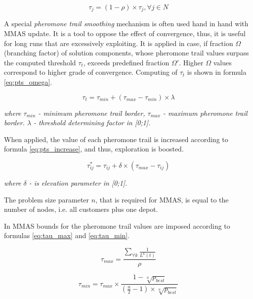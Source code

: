 \documentclass[12pt,a4paper,oneside]{book}
\begin{document}
\begin{enumerate}
\begin{equation}
\tau_j = (1-\rho) \times \tau_j, \forall j \in N
\label{eq:mmas_evaporation}
\end{equation}

A special \textit{pheromone trail smoothing} mechanism is often used hand in hand with MMAS update. It is a tool to oppose the effect of convergence, thus, it is useful for long runs that are excessively exploiting. It is applied in case, if fraction $\Omega$ (branching factor) of solution components, whose pheromone trail values surpass the computed threshold $\tau_t$, exceeds predefined fraction $\Omega'$. Higher $\Omega$ values correspond to higher grade of convergence. Computing of $\tau_t$ is shown in formula \eqref{eq:pts_omega}.

\begin{equation}
\tau_t = \tau_{min} + (\tau_{max} - \tau_{min}) \times \lambda
\label{eq:pts_omega}
\end{equation}

\textit{where $\tau_{min}$ - minimum pheromone trail border, $\tau_{max}$ - maximum pheromone trail border.  $\lambda$ - threshold determining factor in [0;1].}

When applied, the value of each pheromone trail is increased according to formula \eqref{eq:pts_increase}, and thus, exploration is boosted.

\begin{equation}
\tau^*_{ij} = \tau_{ij} + \delta \times (\tau_{max} - \tau_{ij})
\label{eq:pts_increase}
\end{equation}

\textit{where $\delta$ - is elevation parameter in [0;1].}

The problem size parameter $n$, that is required for MMAS, is equal to the number of nodes, i.e. all customers plus one depot.

In MMAS bounds for the pheromone trail values are imposed according to formulas \eqref{eq:tau_max} and \eqref{eq:tau_min}.

\begin{equation}
\tau_{max} = \frac{\sum \limits_{\forall k} \frac{1}{L^k(t)}}{\rho}
\label{eq:tau_max}
\end{equation}

\begin{equation}
\tau_{min} = \tau_{max} \times \frac{1-\sqrt[n]{p_{best}}}{(\frac{n}{2}-1) \times \sqrt[n]{p_{best}}}
\label{eq:tau_min}
\end{equation}


\end{enumerate}
\end{document}
